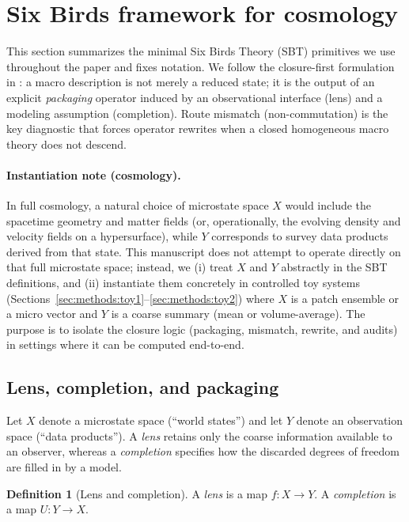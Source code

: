\documentclass[11pt]{article}
\newcommand{\StateSpace}{X}
\newcommand{\ObsSpace}{Y}
\newcommand{\Lens}{f}              \newcommand{\Completion}{U}        \newcommand{\PackageOp}{E}
\theoremstyle{definition}
\newtheorem{definition}{Definition}[section]
\theoremstyle{plain}
\theoremstyle{remark}
\begin{document}
\section{Six Birds framework for cosmology}\label{sec:framework}
This section summarizes the minimal Six Birds Theory (SBT) primitives we use throughout the paper and fixes notation.
We follow the closure-first formulation in \cite{Tsiokos2026SixBirds,Tsiokos2026WakeStone}: a macro description is not merely a reduced state; it is the output of an explicit \emph{packaging} operator induced by an observational interface (lens) and a modeling assumption (completion).
Route mismatch (non-commutation) is the key diagnostic that forces operator rewrites when a closed homogeneous macro theory does not descend.

\paragraph{Instantiation note (cosmology).}
In full cosmology, a natural choice of microstate space $\StateSpace$ would include the spacetime geometry and matter fields (or, operationally, the evolving density and velocity fields on a hypersurface), while $\ObsSpace$ corresponds to survey data products derived from that state.
This manuscript does not attempt to operate directly on that full microstate space; instead, we (i) treat $\StateSpace$ and $\ObsSpace$ abstractly in the SBT definitions, and (ii) instantiate them concretely in controlled toy systems (Sections~\ref{sec:methods:toy1}--\ref{sec:methods:toy2}) where $\StateSpace$ is a patch ensemble or a micro vector and $\ObsSpace$ is a coarse summary (mean or volume-average).
The purpose is to isolate the closure logic (packaging, mismatch, rewrite, and audits) in settings where it can be computed end-to-end.

\subsection{Lens, completion, and packaging}\label{sec:framework:packaging}
Let $\StateSpace$ denote a microstate space (``world states'') and let $\ObsSpace$ denote an observation space (``data products'').
A \emph{lens} retains only the coarse information available to an observer, whereas a \emph{completion} specifies how the discarded degrees of freedom are filled in by a model.

\begin{definition}[Lens and completion]
A \emph{lens} is a map $\Lens:\StateSpace\to\ObsSpace$.
A \emph{completion} is a map $\Completion:\ObsSpace\to\StateSpace$.
\end{definition}
\end{document}

